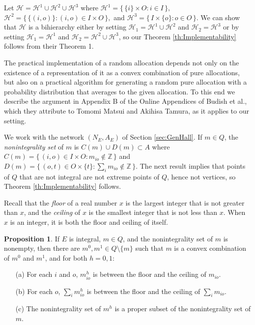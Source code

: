 \documentclass[12pt, A4paper]{article}
\theoremstyle{definition}
\newtheorem{prop}{Proposition}
\newcommand{\In}{\mathbb{Z}}
\newcommand{\cH}{\mathcal{H}}
\begin{document}
\begin{appendix}
Let $\cH = \cH^1 \cup \cH^2 \cup \cH^3$ where 
$\cH^1 = \{\, \{i\} \times O : i \in I \,\},$ $\cH^2 = \{\, \{(i,o)\} : (i,o) \in I \times O \,\},$ and $\cH^3 = \{\, I \times \{o\} : o \in O \,\}.$  We can show that $\cH$ is a bihierarchy either by setting $\cH_1 = \cH^1 \cup \cH^2$ and $\cH_2 = \cH^3$ or by setting $\cH_1 = \cH^1$ and $\cH_2 = \cH^2 \cup \cH^3$, so our Theorem \ref{th:Implementability} follows from their Theorem 1.   

The practical implementation of a random allocation depends not only on the existence of a representation of it as a convex combination of pure allocations, but also on a practical algorithm for generating a random pure allocation with a probability distribution that averages to the given allocation.  To this end we describe the argument in  Appendix B of the Online Appendices of Budish et al., which they attribute to Tomomi Matsui and Akihisa Tamura, as it applies to our setting.

We work with the network $(N_E,A_E)$ of Section \ref{sec:GenHall}.  If $m \in Q$, the \emph{nonintegrality set} of $m$ is $C(m) \cup D(m) \subset A$ where
$C(m) = \{\, (i,o) \in I \times O : m_{io} \notin \In \,\}$ and $D(m) = \{\, (o,t) \in O \times \{t\} : \sum_i m_{io} \notin \In \,\}.$  The next result implies that points of $Q$ that are not integral are not extreme points of $Q$, hence not vertices, so Theorem \ref{th:Implementability} follows.

Recall that the \emph{floor} of a real number $x$ is the largest integer that is not greater than $x$, and the \emph{ceiling} of $x$ is the smallest integer that is not less than $x$.  
When $x$ is an integer, it is both the floor and ceiling of itself. 

\begin{prop} \label{th:ConvexComb}
  If $E$ is integral, $m \in Q$, and the nonintegrality set of $m$ is nonempty, then there are $m^0, m^1 \in Q \setminus \{m\}$ such that $m$ is a convex combination of $m^0$ and $m^1$, and for both $h = 0,1$:
  \begin{enumerate}
     \item[(a)] For each $i$ and $o$, $m^h_{io}$ is between the floor and the ceiling of $m_{io}$.
     \item[(b)] For each $o$, $\sum_i m^h_{io}$ is between the floor and the ceiling of $\sum_i m_{io}$.
     \item[(c)] The nonintegrality set of $m^h$ is a proper subset of the nonintegrality set of $m$.
  \end{enumerate}
\end{prop}


\end{appendix}
\end{document}
